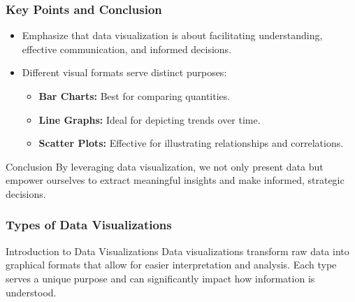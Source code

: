 \documentclass[aspectratio=169]{beamer}
\begin{document}
\begin{frame}[fragile]
    \frametitle{Key Points and Conclusion}
    \begin{itemize}
        \item Emphasize that data visualization is about facilitating understanding, effective communication, and informed decisions.
        \item Different visual formats serve distinct purposes:
        \begin{itemize}
            \item \textbf{Bar Charts:} Best for comparing quantities.
            \item \textbf{Line Graphs:} Ideal for depicting trends over time.
            \item \textbf{Scatter Plots:} Effective for illustrating relationships and correlations.
        \end{itemize}
    \end{itemize}
    \begin{block}{Conclusion}
        By leveraging data visualization, we not only present data but empower ourselves to extract meaningful insights and make informed, strategic decisions.
    \end{block}
\end{frame}

\begin{frame}[fragile]
    \frametitle{Types of Data Visualizations}
    \begin{block}{Introduction to Data Visualizations}
        Data visualizations transform raw data into graphical formats that allow for easier interpretation and analysis. Each type serves a unique purpose and can significantly impact how information is understood.
    \end{block}
\end{frame}
\end{document}
